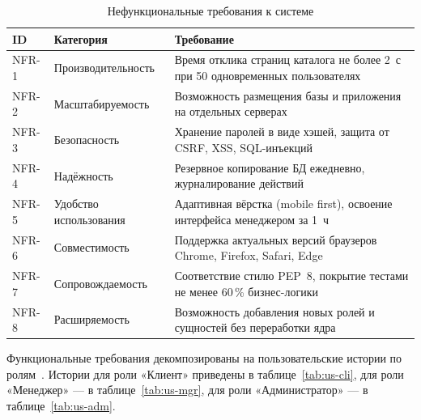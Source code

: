 \begin{table}[ht!]
\caption{Нефункциональные требования к системе}
\label{tab:nfr}
\small
\begin{tabularx}{\textwidth}{|>{\centering\arraybackslash}p{}|>{\RaggedRight\arraybackslash}p{}|>{\RaggedRight\arraybackslash}X|}
\hline
\textbf{ID} & \textbf{Категория} & \textbf{Требование} \\ \hline
NFR-1 & Производительность & Время отклика страниц каталога не более 2~с при 50 одновременных пользователях \\ \hline
NFR-2 & Масштабируемость & Возможность размещения базы и приложения на отдельных серверах \\ \hline
NFR-3 & Безопасность & Хранение паролей в виде хэшей, защита от CSRF, XSS, SQL-инъекций \\ \hline
NFR-4 & Надёжность & Резервное копирование БД ежедневно, журналирование действий \\ \hline
NFR-5 & Удобство использования & Адаптивная вёрстка (mobile first), освоение интерфейса менеджером за 1~ч \\ \hline
NFR-6 & Совместимость & Поддержка актуальных версий браузеров Chrome, Firefox, Safari, Edge \\ \hline
NFR-7 & Сопровождаемость & Соответствие стилю PEP~8, покрытие тестами не менее 60\,\% бизнес-логики \\ \hline
NFR-8 & Расширяемость & Возможность добавления новых ролей и сущностей без переработки ядра \\ \hline
\end{tabularx}
\end{table}

Функциональные требования декомпозированы на пользовательские истории по ролям~\cite{cohn2004}. Истории для роли «Клиент» приведены в таблице~\ref{tab:us-cli}, для роли «Менеджер» --- в таблице~\ref{tab:us-mgr}, для роли «Администратор» --- в таблице~\ref{tab:us-adm}.


